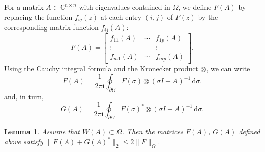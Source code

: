 \documentclass[11pt,a4paper]{amsart}
\newtheorem{lemma}[theorem]{Lemma}
\newcommand{\C}{{\mathbb C}}
\begin{document}
For a matrix $A \in \C^{n\times n}$ with eigenvalues contained in $\Omega$, we define $F(A)$ by replacing the function $f_{ij}(z)$ at each entry $(i,j)$ of $F(z)$ by the corresponding matrix function $f_{ij}(A)$:
\[
 F(A) = \begin{bmatrix}
f_{11}(A) & \cdots & f_{1p}(A) \\
\vdots & & \vdots \\
f_{m1}(A) & \cdots & f_{mp}(A)
\end{bmatrix}.
\]
Using the Cauchy integral formula and the Kronecker product $\otimes$, we can write
\[
 F(A) = \frac{1}{2\pi \mathrm{i}} \oint_{\partial \Omega} F(\sigma) \otimes (\sigma I -A)^{-1} \,\mathrm{d}\sigma.
\]
and, in turn,
\[
 G(A) = \frac{1}{2\pi \mathrm{i}} \oint_{\partial \Omega} F(\sigma)^* \otimes (\sigma I -A)^{-1} \,\mathrm{d}\sigma.
\]
\begin{lemma} \label{lemma:2} Assume that $W(A)\subset \Omega$. Then the matrices $F(A)$, $G(A)$ defined above satisfy $\|F(A)+G(A)^*\|_2 \le 2 \|F\|_\Omega$.
\end{lemma}
\end{document}
